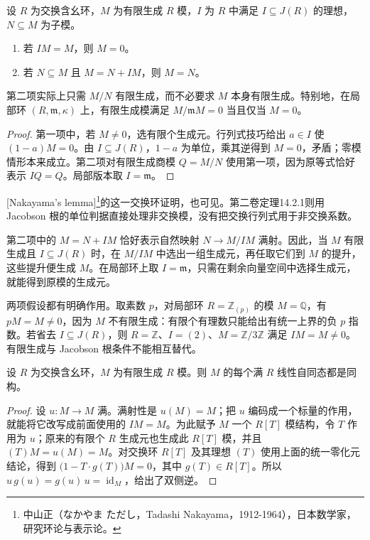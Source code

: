 \begin{theorem}[Nakayama 引理]\label{b3:thm:nakayama}
	设 \(R\) 为交换含幺环，\(M\) 为有限生成 \(R\) 模，\(I\) 为 \(R\) 中满足 \(I\subseteq J(R)\) 的理想，\(N\subseteq M\) 为子模。
	\begin{enumerate}
		\item 若 \(IM=M\)，则 \(M=0\)。
		\item 若 \(N\subseteq M\) 且 \(M=N+IM\)，则 \(M=N\)。
	\end{enumerate}
	第二项实际上只需 \(M/N\) 有限生成，而不必要求 \(M\) 本身有限生成。特别地，在局部环 \((R,\mathfrak m,\kappa)\) 上，有限生成模满足 \(M/\mathfrak mM=0\) 当且仅当 \(M=0\)。
\end{theorem}
\begin{proof}
	第一项中，若 \(M\ne0\)，选有限个生成元。行列式技巧给出 \(a\in I\) 使 \((1-a)M=0\)。由 \(I\subseteq J(R)\)，\(1-a\) 为单位，乘其逆得到 \(M=0\)，矛盾；零模情形本来成立。第二项对有限生成商模 \(Q=M/N\) 使用第一项，因为原等式恰好表示 \(IQ=Q\)。局部版本取 \(I=\mathfrak m\)。
\end{proof}

[Nakayama's lemma]\footnote{中山正（なかやま ただし，Tadashi Nakayama，1912-1964），日本数学家，研究环论与表示论。}的这一交换环证明，也可见\cite[Theorem 2.2 and Corollary, p. 8]{Matsumura1989CommutativeRingTheory}。第二卷定理14.2.1则用 Jacobson 根的单位判据直接处理非交换模，没有把交换行列式用于非交换系数。

\ProseParagraphBreak
第二项中的 \(M=N+IM\) 恰好表示自然映射 \(N\to M/IM\) 满射。因此，当 \(M\) 有限生成且 \(I\subseteq J(R)\) 时，在 \(M/IM\) 中选出一组生成元，再任取它们到 \(M\) 的提升，这些提升便生成 \(M\)。在局部环上取 \(I=\mathfrak m\)，只需在剩余向量空间中选择生成元，就能得到原模的生成元。

\ProseParagraphBreak
两项假设都有明确作用。取素数 \(p\)，对局部环 \(R=\mathbb Z_{(p)}\) 的模 \(M=\mathbb Q\)，有 \(pM=M\ne0\)，因为 \(M\) 不有限生成：有限个有理数只能给出有统一上界的负 \(p\) 指数。若省去 \(I\subseteq J(R)\)，则 \(R=\mathbb Z\)、\(I=(2)\)、\(M=\mathbb Z/3\mathbb Z\) 满足 \(IM=M\ne0\)。有限生成与 Jacobson 根条件不能相互替代。

\begin{corollary}\label{b3:cor:finite-surjective-endomorphism}
	设 \(R\) 为交换含幺环，\(M\) 为有限生成 \(R\) 模。则 \(M\) 的每个满 \(R\) 线性自同态都是同构。
\end{corollary}
\begin{proof}
	设 \(u:M\rightarrow M\) 满。满射性是 \(u(M)=M\)；把 \(u\) 编码成一个标量的作用，就能将它改写成前面使用的 \(IM=M\)。为此赋予 \(M\) 一个 \(R[T]\) 模结构，令 \(T\) 作用为 \(u\)；原来的有限个 \(R\) 生成元也生成此 \(R[T]\) 模，并且 \((T)M=u(M)=M\)。对交换环 \(R[T]\) 及其理想 \((T)\) 使用上面的统一零化元结论，得到 \(\bigl(1-T\cdot g(T)\bigr)M=0\)，其中 \(g(T)\in R[T]\)。所以 \(u\,g(u)=g(u)\,u=\operatorname{id}_M\)，给出了双侧逆。
\end{proof}

